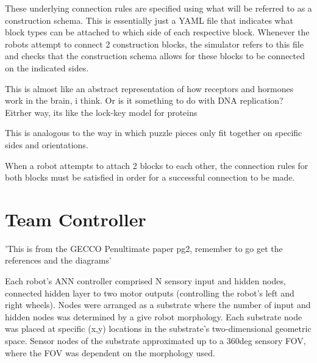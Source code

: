 These underlying connection rules are specified using what will be referred to as a construction schema. This is essentially just a YAML file that indicates what block types can be attached to which side of each respective block. Whenever the robots attempt to connect 2 construction blocks, the simulator refers to this file and checks that the construction schema allows for these blocks to be connected on the indicated sides.

This is almost like an abstract representation of how receptors and hormones work in the brain, i think. Or is it something to do with DNA replication? Eitrher way, its like the lock-key model for proteins

This is analogous to the way in which puzzle pieces only fit together on specific sides and orientations.

When a robot attempts to attach 2 blocks to each other, the connection rules for both blocks must be satisfied in order for a successful connection to be made.


\section{Team Controller}

'This is from the GECCO Penultimate paper pg2, remember to go get the references and the diagrams'

Each robot's ANN controller comprised N sensory input and hidden nodes, connected hidden layer to two motor outputs (controlling the robot's left and right wheels). Nodes were arranged as a substrate where the number of input and hidden nodes was determined by a give robot morphology. Each substrate node was placed at specific (x,y) locations in the substrate's two-dimensional geometric space. Sensor nodes of the substrate approximated up to a 360deg sensory FOV, where the FOV was dependent on the morphology used.































